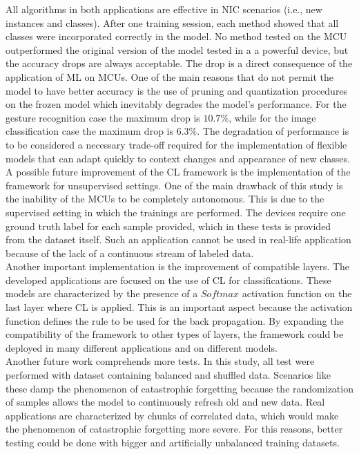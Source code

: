 \documentclass[12pt]{report}
\begin{document}
All algorithms in both applications are effective in NIC scenarios (i.e., new instances and classes). After one training session, each method showed that all classes were incorporated correctly in the model. No method tested on the MCU outperformed the original version of the model tested in a a powerful device, but the accuracy drops are always acceptable. The drop is a direct consequence of the application of ML on MCUs. One of the main reasons that do not permit the model to have better accuracy is the use of pruning and quantization procedures on the frozen model which inevitably degrades the model's performance. For the gesture recognition case the maximum drop is $10.7 \%$, while for the image classification case the maximum drop is $6.3 \%$. The degradation of performance is to be considered a necessary trade-off required for the implementation of flexible models that can adapt quickly to context changes and appearance of new classes.\\

A possible future improvement of the CL framework is the implementation of the framework for unsupervised settings. One of the main drawback of this study is the inability of the MCUs to be completely autonomous. This is due to the supervised setting in which the trainings are performed. The devices require one ground truth label for each sample provided, which in these tests is provided from the dataset itself. Such an application cannot be used in real-life application because of the lack of a continuous stream of labeled data.\\
Another important implementation is the improvement of compatible layers. The developed applications are focused on the use of CL for classifications. These models are characterized by the presence of a $Softmax$ activation function on the last layer where CL is applied. This is an important aspect because the activation function defines the rule to be used for the back propagation. By expanding the compatibility of the framework to other types of layers, the framework could be deployed in many different applications and on different models.\\
Another future work comprehends more tests. In this study, all test were performed with dataset containing balanced and shuffled data. Scenarios like these damp the phenomenon of catastrophic forgetting because the randomization of samples allows the model to continuously refresh old and new data. Real applications are characterized by chunks of correlated data, which would make the phenomenon of catastrophic forgetting more severe. For this reasons, better testing could be done with bigger and artificially unbalanced training datasets.



\printbibliography
\end{document}
